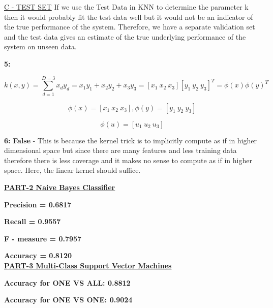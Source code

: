 \documentclass{report}
\begin{document}
\begin{flushleft}
\underline {C - TEST SET}  \linebreak[2]
If we use the Test Data in KNN to determine the parameter k then it would probably fit the test data well but it would not be an indicator of the true performance of the system. Therefore, we have a separate validation set and the test data gives an estimate of the true underlying performance of the system on unseen data. \newline

\textbf{5:} \linebreak[2]

\[
k(x, y) = \sum_{d=1}^{D=3}x_{d}y_{d}
		= x_{1}y_{1} + x_{2}y_{2} + x_{3}y_{3}
		= [x_1 \: x_2 \: x_3][y_1 \: y_2 \: y_3]^T
		= \phi{(x)}\phi{(y)}^T
\]

\begin{equation}
\phi{(x)} = [x_1 \: x_2 \: x_3], \phi{(y)} = [y_1 \: y_2 \: y_3]
\end{equation}

\begin{equation}
\phi{(u)} = [u_1 \: u_2 \: u_3]
\end{equation}

\textbf{6:} \newline \newline
\textbf{False} - This is because the kernel trick is to implicitly compute as if in higher dimensional space but since there are many features and less training data therefore there is less coverage and it makes no sense to compute as if in higher space. Here, the linear kernel should suffice.

\break

\underline { \textbf{PART-2 Naive Bayes Classifier}}  \linebreak[2]

\textbf{Precision = 0.6817} \linebreak[2]

\textbf{Recall = 0.9557} \linebreak[2]

\textbf{F - measure = 0.7957} \linebreak[2]

\textbf{Accuracy = 0.8120} \\[1.5in]

\underline { \textbf{PART-3 Multi-Class Support Vector Machines}}  \linebreak[2]

\textbf{Accuracy for ONE VS ALL:
    0.8812} \linebreak[2]

\textbf{Accuracy for ONE VS ONE:
    0.9024} \linebreak[2]

\end{flushleft} 
\end{document}
